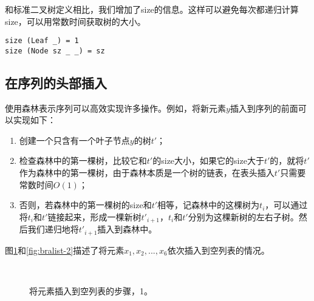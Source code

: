 \documentclass[UTF8]{article}
\begin{document}
和标准二叉树定义相比，我们增加了size的信息。这样可以避免每次都递归计算size，可以用常数时间获取树的大小。

\begin{lstlisting}
size (Leaf _) = 1
size (Node sz _ _) = sz
\end{lstlisting}

\subsection{在序列的头部插入}
使用森林表示序列可以高效实现许多操作。例如，将新元素$y$插入到序列的前面可以实现如下：

\begin{enumerate}
\item 创建一个只含有一个叶子节点$y$的树$t'$；
\item 检查森林中的第一棵树，比较它和$t'$的size大小，如果它的size大于$t'$的，就将$t'$作为森林中的第一棵树，由于森林本质是一个树的链表，在表头插入$t'$只需要常数时间$O(1)$；
\item 否则，若森林中的第一棵树的size和$t'$相等，记森林中的这棵树为$t_i$，可以通过将$t_i$和$t'$链接起来，形成一棵新树$t'_{i+1}$，$t_i$和$t'$分别为这棵新树的左右子树。然后我们递归地将$t'_{i+1}$插入到森林中。
\end{enumerate}

图\ref{fig:bralist-1}和\ref{fig:bralist-2}描述了将元素$x_1, x_2, ..., x_6$依次插入到空列表的情况。

\begin{figure}[htbp]
  \centering
   \\
  \caption{将元素插入到空列表的步骤，1。} \label{fig:bralist-1}
\end{figure}
\end{document}
